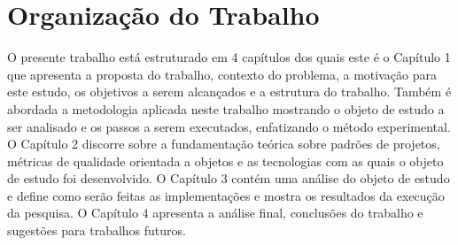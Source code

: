 \section{Organização do Trabalho}

O presente trabalho está estruturado em 4 capítulos dos quais este é o
Capítulo 1 que apresenta a proposta do trabalho, contexto do problema, a
motivação para este estudo, os objetivos a serem alcançados e a estrutura do
trabalho. Também é abordada a metodologia aplicada neste trabalho mostrando o
objeto de estudo a ser analisado e os passos a serem executados, enfatizando o
método experimental.
O Capítulo 2 discorre sobre a fundamentação teórica sobre padrões de projetos,
métricas de qualidade orientada a objetos e as tecnologias com as quais o objeto
de estudo foi desenvolvido.
O Capítulo 3 contém uma análise do objeto de estudo e define como serão feitas
as implementações e mostra os resultados da execução da pesquisa.
O Capítulo 4 apresenta a análise final, conclusões do trabalho e sugestões para
trabalhos futuros.

